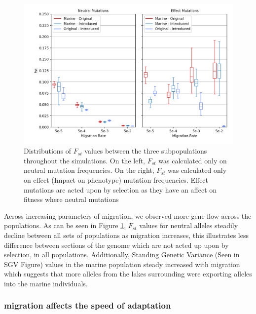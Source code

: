 \documentclass{article}
\begin{document}
\begin{figure}
	\begin{center}
  		\includegraphics[width=0.8\linewidth]{matplotlibPlots/FST_HRR.png}
  		\caption{Distributions of $F_{st}$  values between the three subpopulations throughout the simulations.
		On the left, $F_{st}$ was calculated only on neutral mutation frequencies. On the right, $F_{st}$ was calculated
		only on effect (Impact on phenotype) mutation frequencies. 
		Effect mutations are acted upon by selection as they have an affect on fitness where neutral mutations  }
  		\label{fig:Fst}
	\end{center}
\end{figure}

Across increasing parameters of migration, we observed more gene flow across the populations. 
As can be seen in Figure \ref{fig:Fst},
$F_{st}$ values for neutral alleles steadily decline between all sets of populations as 
migration increases, this illustrates less difference between sections of the genome which are not acted up 
upon by selection, in all populations.
Additionally, Standing Genetic Variance 
(Seen in SGV Figure)
values in the marine population steady increased with migration which suggests that more alleles from the 
lakes surrounding were exporting alleles into the marine individuals.


\subsubsection*{migration affects the speed of adaptation}
\end{document}

